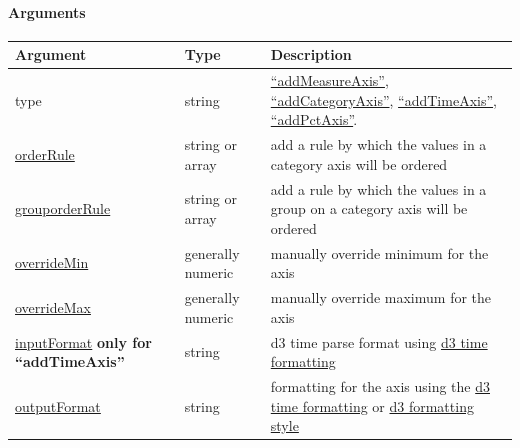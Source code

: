 \documentclass[letterpaper,10pt,english]{sphinxmanual}
\begin{document}
\paragraph{Arguments}
\label{dimple/api:arguments}
\begin{tabulary}{\linewidth}{|L|L|L|}
\hline
\textsf{\relax 
Argument
} & \textsf{\relax 
Type
} & \textsf{\relax 
Description
}\\
\hline
type
 & 
string
 & 
\href{https://github.com/PMSI-AlignAlytics/dimple/wiki/dimple.chart\#addMeasureAxis}{``addMeasureAxis''}, \href{https://github.com/PMSI-AlignAlytics/dimple/wiki/dimple.chart\#addCategoryAxis}{``addCategoryAxis''}, \href{https://github.com/PMSI-AlignAlytics/dimple/wiki/dimple.chart\#addTimeAxis}{``addTimeAxis''}, \href{https://github.com/PMSI-AlignAlytics/dimple/wiki/dimple.chart\#addPctAxis}{``addPctAxis''}.
\\

\href{https://github.com/PMSI-AlignAlytics/dimple/wiki/dimple.axis\#addOrderRule}{orderRule}
 & 
string or array
 & 
add a rule by which the values in a category axis will be ordered
\\

\href{https://github.com/PMSI-AlignAlytics/dimple/wiki/dimple.axis\#addGroupOrderRule}{grouporderRule}
 & 
string or array
 & 
add a rule by which the values in a group on a category axis will be ordered
\\

\href{https://github.com/PMSI-AlignAlytics/dimple/wiki/dimple.axis\#overrideMin}{overrideMin}
 & 
generally numeric
 & 
manually override minimum for the axis
\\

\href{https://github.com/PMSI-AlignAlytics/dimple/wiki/dimple.axis\#overrideMax}{overrideMax}
 & 
generally numeric
 & 
manually override maximum for the axis
\\

\href{https://github.com/PMSI-AlignAlytics/dimple/wiki/dimple.axis\#dateParseFormat}{inputFormat}  \textbf{only for ``addTimeAxis''}
 & 
string
 & 
d3 time parse format using \href{https://github.com/mbostock/d3/wiki/Time-Formatting}{d3 time formatting}
\\

\href{https://github.com/PMSI-AlignAlytics/dimple/wiki/dimple.axis\#tickFormat}{outputFormat}
 & 
string
 & 
formatting for the axis using the \href{https://github.com/mbostock/d3/wiki/Time-Formatting}{d3 time formatting} or \href{https://github.com/mbostock/d3/wiki/Formatting}{d3 formatting style}
\\
\hline\end{tabulary}
\end{document}
